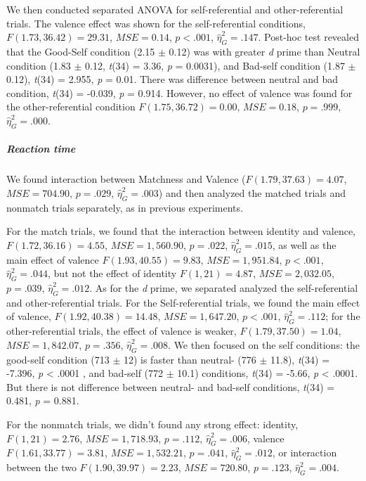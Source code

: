 \documentclass[
  english,
  man]{apa6}
\let\oldsubparagraph\subparagraph
\renewcommand{\subparagraph}[1]{\oldsubparagraph{#1}\mbox{}}
\begin{document}
We then conducted separated ANOVA for self-referential and other-referential trials. The valence effect was shown for the self-referential conditions, \(F(1.73, 36.42) = 29.31\), \(\mathit{MSE} = 0.14\), \(p < .001\), \(\hat{\eta}^2_G = .147\). Post-hoc test revealed that the Good-Self condition (2.15 \(\pm\) 0.12) was with greater \emph{d} prime than Neutral condition (1.83 \(\pm\) 0.12, \emph{t}(34) = 3.36, \emph{p} = 0.0031), and Bad-self condition (1.87 \(\pm\) 0.12), \emph{t}(34) = 2.955, \emph{p} = 0.01. There was difference between neutral and bad condition, \emph{t}(34) = -0.039, \emph{p} = 0.914. However, no effect of valence was found for the other-referential condition \(F(1.75, 36.72) = 0.00\), \(\mathit{MSE} = 0.18\), \(p = .999\), \(\hat{\eta}^2_G = .000\).

\hypertarget{reaction-time-8}{%
\subparagraph{Reaction time}\label{reaction-time-8}}

We found interaction between Matchness and Valence (\(F(1.79, 37.63) = 4.07\), \(\mathit{MSE} = 704.90\), \(p = .029\), \(\hat{\eta}^2_G = .003\)) and then analyzed the matched trials and nonmatch trials separately, as in previous experiments.

For the match trials, we found that the interaction between identity and valence, \(F(1.72, 36.16) = 4.55\), \(\mathit{MSE} = 1,560.90\), \(p = .022\), \(\hat{\eta}^2_G = .015\), as well as the main effect of valence \(F(1.93, 40.55) = 9.83\), \(\mathit{MSE} = 1,951.84\), \(p < .001\), \(\hat{\eta}^2_G = .044\), but not the effect of identity \(F(1, 21) = 4.87\), \(\mathit{MSE} = 2,032.05\), \(p = .039\), \(\hat{\eta}^2_G = .012\). As for the \emph{d} prime, we separated analyzed the self-referential and other-referential trials. For the Self-referential trials, we found the main effect of valence, \(F(1.92, 40.38) = 14.48\), \(\mathit{MSE} = 1,647.20\), \(p < .001\), \(\hat{\eta}^2_G = .112\); for the other-referential trials, the effect of valence is weaker, \(F(1.79, 37.50) = 1.04\), \(\mathit{MSE} = 1,842.07\), \(p = .356\), \(\hat{\eta}^2_G = .008\). We then focused on the self conditions: the good-self condition (713 \(\pm\) 12) is faster than neutral- (776 \(\pm\) 11.8), \emph{t}(34) = -7.396, \emph{p} \textless{} .0001 , and bad-self (772 \(\pm\) 10.1) conditions, \emph{t}(34) = -5.66, \emph{p} \textless{} .0001. But there is not difference between neutral- and bad-self conditions, \emph{t}(34) = 0.481, \emph{p} = 0.881.

For the nonmatch trials, we didn't found any strong effect: identity, \(F(1, 21) = 2.76\), \(\mathit{MSE} = 1,718.93\), \(p = .112\), \(\hat{\eta}^2_G = .006\), valence \(F(1.61, 33.77) = 3.81\), \(\mathit{MSE} = 1,532.21\), \(p = .041\), \(\hat{\eta}^2_G = .012\), or interaction between the two \(F(1.90, 39.97) = 2.23\), \(\mathit{MSE} = 720.80\), \(p = .123\), \(\hat{\eta}^2_G = .004\).
\end{document}

